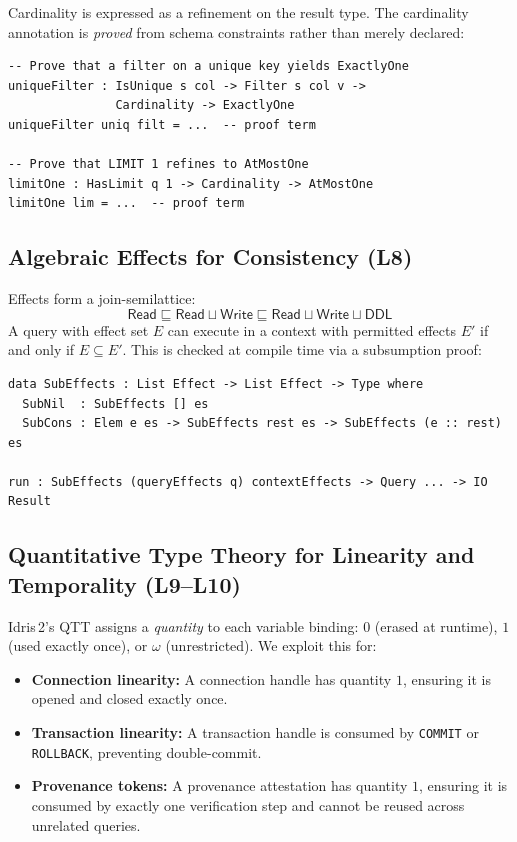 \documentclass[11pt,a4paper]{article}
\newcommand{\Leq}{\ensuremath{\sqsubseteq}}
\begin{document}
Cardinality is expressed as a refinement on the result type.
The cardinality annotation is \emph{proved} from schema constraints
rather than merely declared:

\begin{lstlisting}[language=Idris2]
-- Prove that a filter on a unique key yields ExactlyOne
uniqueFilter : IsUnique s col -> Filter s col v ->
               Cardinality -> ExactlyOne
uniqueFilter uniq filt = ...  -- proof term

-- Prove that LIMIT 1 refines to AtMostOne
limitOne : HasLimit q 1 -> Cardinality -> AtMostOne
limitOne lim = ...  -- proof term
\end{lstlisting}

\subsection{Algebraic Effects for Consistency (L8)}

Effects form a join-semilattice:
\[
  \mathsf{Read} \Leq \mathsf{Read} \sqcup \mathsf{Write}
  \Leq \mathsf{Read} \sqcup \mathsf{Write} \sqcup \mathsf{DDL}
\]
A query with effect set $E$ can execute in a context with permitted
effects $E'$ if and only if $E \subseteq E'$.  This is checked at
compile time via a subsumption proof:

\begin{lstlisting}[language=Idris2]
data SubEffects : List Effect -> List Effect -> Type where
  SubNil  : SubEffects [] es
  SubCons : Elem e es -> SubEffects rest es -> SubEffects (e :: rest) es

run : SubEffects (queryEffects q) contextEffects -> Query ... -> IO Result
\end{lstlisting}

\subsection{Quantitative Type Theory for Linearity and Temporality (L9--L10)}

Idris\,2's QTT assigns a \emph{quantity} to each variable binding:
$0$ (erased at runtime), $1$ (used exactly once), or $\omega$
(unrestricted).  We exploit this for:

\begin{itemize}[nosep]
  \item \textbf{Connection linearity:} A connection handle has quantity
    $1$, ensuring it is opened and closed exactly once.
  \item \textbf{Transaction linearity:} A transaction handle is
    consumed by \texttt{COMMIT} or \texttt{ROLLBACK}, preventing
    double-commit.
  \item \textbf{Provenance tokens:} A provenance attestation has
    quantity $1$, ensuring it is consumed by exactly one verification
    step and cannot be reused across unrelated queries.
\end{itemize}
\end{document}
